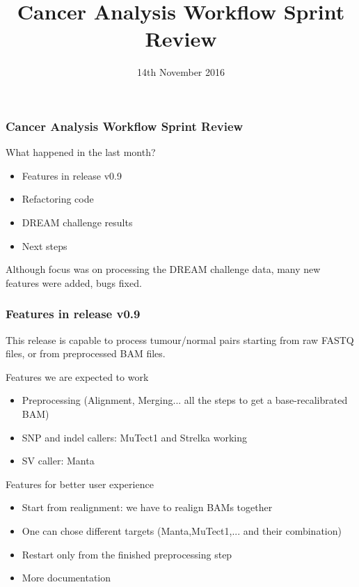 \documentclass{beamer}
\title{Cancer Analysis Workflow Sprint Review}
\institute{SciLifeLab}
\date{14th November 2016 }
\begin{document}
\frame{\titlepage}
			  
\begin{frame}
\frametitle{Cancer Analysis Workflow Sprint Review}
\begin{block}{What happened in the last month?}
    \begin{itemize}
	\item Features in release v0.9
        \item Refactoring code
	\item DREAM challenge results
	\item Next steps
    \end{itemize}
    Although focus was on processing the DREAM challenge data, many new features were added, bugs fixed.
\end{block}
\end{frame}

\begin{frame}
\frametitle{Features in release v0.9}
This release is capable to process tumour/normal pairs starting from raw FASTQ files, or from preprocessed BAM files.
	\begin{block}{Features we are expected to work}
            \begin{itemize}
                \item Preprocessing (Alignment, Merging... all the steps to get a base-recalibrated BAM)
                \item SNP and indel callers: MuTect1 and Strelka working
                \item SV caller: Manta
            \end{itemize}
	\end{block}
        \begin{block}{Features for better user experience}
	    \begin{itemize}
		\item Start from realignment: we have to realign BAMs together
		\item One can chose different targets (Manta,MuTect1,... and their combination)
		\item Restart only from the finished preprocessing step
                \item More documentation
	    \end{itemize}
        \end{block}
\end{frame}
\end{document}
